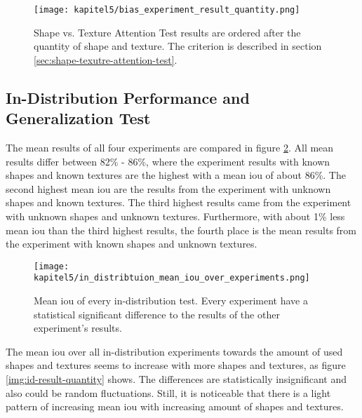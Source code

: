 			\FloatBarrier
			\begin{figure}[h]
				\centering
				\texttt{[image: kapitel5/bias\_experiment\_result\_quantity.png]}
				\caption[Shape vs. Texture Attention Test results are ordered after the quantity of shape and texture. The criterion is described in section \ref{sec:shape-texutre-attention-test}.]{Shape vs. Texture Attention Test results are ordered after the quantity of shape and texture. The criterion is described in section \ref{sec:shape-texutre-attention-test}.}
				\label{img:bias-result-quantity-type}
			\end{figure}
			\FloatBarrier
		
		\clearpage
		\subsection{In-Distribution Performance and Generalization Test}
			The mean results of all four experiments are compared in figure \ref{img:id-result}. All mean results differ between 82\% - 86\%, where the experiment results with known shapes and known textures are the highest with a mean \ac{iou} of about 86\%. The second highest mean \ac{iou} are the results from the experiment with unknown shapes and known textures. The third highest results came from the experiment with unknown shapes and unknown textures. Furthermore, with about 1\% less mean \ac{iou} than the third highest results, the fourth place is the mean results from the experiment with known shapes and unknown textures.
			\FloatBarrier
			\begin{figure}[h]
				\centering
				\texttt{[image: kapitel5/in\_distribtuion\_mean\_iou\_over\_experiments.png]}
				\caption[Mean \ac{iou} of every in-distribution test. Every experiment have a statistical significant difference to the results of the other experiment's results.]{Mean \ac{iou} of every in-distribution test. Every experiment have a statistical significant difference to the results of the other experiment's results.}
				\label{img:id-result}
			\end{figure}
			\FloatBarrier
			
			The mean \ac{iou} over all in-distribution experiments towards the amount of used shapes and textures seems to increase with more shapes and textures, as figure \ref{img:id-result-quantity} shows. The differences are statistically insignificant and also could be random fluctuations. Still, it is noticeable that there is a light pattern of increasing mean \ac{iou} with increasing amount of shapes and textures.
			
